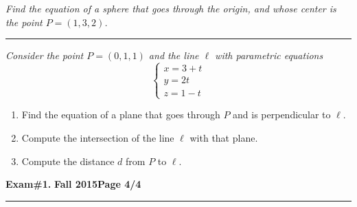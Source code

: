 \documentclass[12pt]{article}
\begin{document}
\bigskip
{\problem[10 pts] \em Find the equation of a sphere that goes through the origin, and whose center is the point $P=(1,3,2)$.} 
\vspace{2cm}
\begin{flushright}
\end{flushright}
\hrule
{\problem[15 pts] \em Consider the point $P=(0,1,1)$ and the line $\ell$ with parametric equations}
\begin{equation*}
\begin{cases}
x = 3+t \\ y = 2t \\ z = 1-t
\end{cases}
\end{equation*}
\begin{enumerate}
\item Find the equation of a plane that goes through $P$ and is perpendicular to $\ell$.
\vspace{2cm}
\begin{flushright}
\end{flushright}
\item  Compute the intersection of the line $\ell$ with that plane.
\vspace{3cm}
\begin{flushright}
\end{flushright}
\item Compute the distance $d$ from $P$ to $\ell$.
\vspace{2cm}
\begin{flushright}
\end{flushright}
\end{enumerate}
\newpage

\hfill{\large\bf Exam\#1.}\hfill{\large\bf
  Fall 2015}\hfill{\large\bf Page 4/4}\hrule
\end{document}
